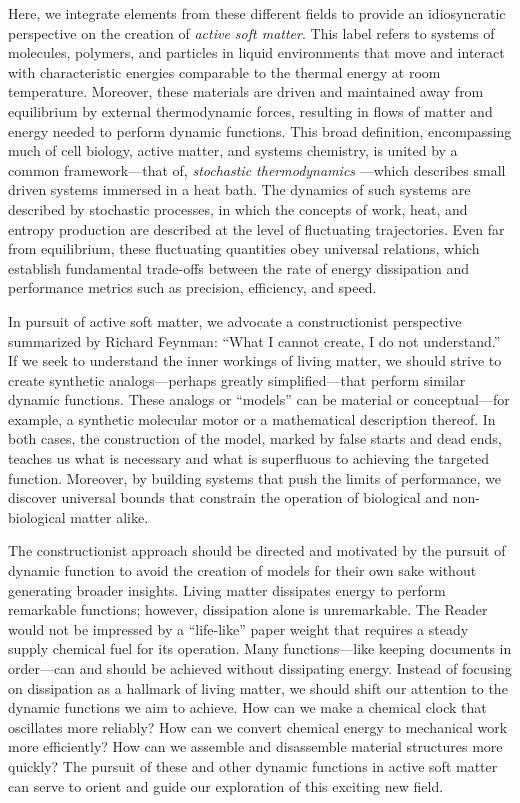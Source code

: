 \begin{appendices}
Here, we integrate elements from these different fields to provide an idiosyncratic perspective on the creation of \emph{active soft matter}. This label refers to systems of molecules, polymers, and particles in liquid environments that move and interact with characteristic energies comparable to the thermal energy at room temperature. Moreover, these materials are driven and maintained away from equilibrium by external thermodynamic forces, resulting in flows of matter and energy needed to perform dynamic functions. This broad definition, encompassing much of cell biology, active matter, and systems chemistry, is united by a common framework---that of, \emph{stochastic thermodynamics} \autocite{Seifert2012}---which describes small driven systems immersed in a heat bath.  The dynamics of such systems are described by stochastic processes, in which the concepts of work, heat, and entropy production are described at the level of fluctuating trajectories. Even far from equilibrium, these fluctuating quantities obey universal relations, which establish fundamental trade-offs between the rate of energy dissipation and performance metrics such as precision, efficiency, and speed. 

In pursuit of active soft matter, we advocate a constructionist perspective summarized by Richard Feynman: ``What I cannot create, I do not understand.'' If we seek to understand the inner workings of living matter, we should strive to create synthetic analogs---perhaps greatly simplified---that perform similar dynamic functions. These analogs or ``models'' can be material or conceptual---for example, a synthetic molecular motor or a mathematical description thereof.  In both cases, the construction of the model, marked by false starts and dead ends, teaches us what is necessary and what is superfluous to achieving the targeted function.  Moreover, by building systems that push the limits of performance, we discover universal bounds that constrain the operation of biological and non-biological matter alike.

The constructionist approach should be directed and motivated by the pursuit of dynamic function to avoid the creation of models for their own sake without generating broader insights.  Living matter dissipates energy to perform remarkable functions; however, dissipation alone is unremarkable. The Reader would not be impressed by a ``life-like'' paper weight that requires a steady supply chemical fuel for its operation. Many functions---like keeping documents in order---can and should be achieved without dissipating energy. Instead of focusing on dissipation as a hallmark of living matter, we should shift our attention to the dynamic functions we aim to achieve.  How can we make a chemical clock that oscillates more reliably?  How can we convert chemical energy to mechanical work more efficiently?  How can we assemble and disassemble material structures more quickly?  The pursuit of these and other dynamic functions in active soft matter can serve to orient and guide our exploration of this exciting new field.


\end{appendices}
